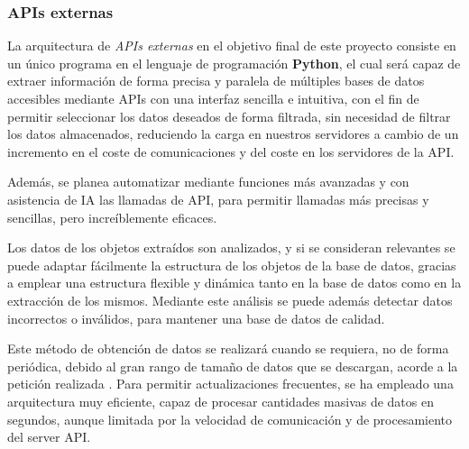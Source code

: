 \subsubsection{APIs externas}

La arquitectura de \textit{APIs externas} en el objetivo final de este proyecto consiste en un único programa en el lenguaje de programación \textbf{Python}, 
el cual será capaz de extraer información de forma precisa y paralela de múltiples bases de datos accesibles mediante APIs con una interfaz sencilla e intuitiva, 
con el fin de permitir seleccionar los datos deseados de forma filtrada, sin necesidad de filtrar los datos almacenados, 
reduciendo la carga en nuestros servidores a cambio de un incremento en el coste de comunicaciones y del coste en los servidores de la API. 

Además, se planea automatizar mediante funciones más avanzadas y con asistencia de IA las llamadas de API, para permitir llamadas más precisas y sencillas, pero increíblemente eficaces.

Los datos de los objetos extraídos son analizados, y si se consideran relevantes se puede adaptar fácilmente la estructura de los objetos de la base de datos, 
gracias a emplear una estructura flexible y dinámica tanto en la base de datos como en la extracción de los mismos. 
Mediante este análisis se puede además detectar datos incorrectos o inválidos, para mantener una base de datos de calidad.

Este método de obtención de datos se realizará cuando se requiera, no de forma periódica, debido al gran rango de tamaño de datos que se descargan, acorde a la petición realizada . 
Para permitir actualizaciones frecuentes, se ha empleado una arquitectura muy eficiente, capaz de procesar cantidades masivas de datos en segundos, aunque limitada por la velocidad de comunicación y de procesamiento del server API.
